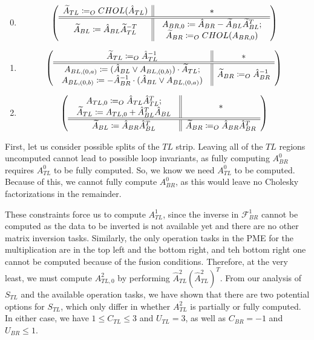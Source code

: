 \documentclass[12pt,letterpaper]{article}
\newcommand*{\opF}{\mathcal{F}}
\begin{document}
\begin{enumerate}
\setcounter{enumi}{-1} %
\item
  \begin{equation*}
  \left( \begin{array}{c || c} \widetilde{A}_{TL} \coloneqq_O CHOL(\hat{A}_{TL}) & * \\ \hline \hline \widetilde{A}_{BL} \coloneqq \hat{A}_{BL}\widetilde{A}_{TL}^{-T} & \begin{array}{c}
     A_{BR, 0} \coloneqq \hat{A}_{BR} - \widetilde{A}_{BL}\widetilde{A}_{BL}^T;\\
     \widetilde{A}_{BR} \coloneqq_O CHOL(A_{BR, 0})
   \end{array} \end{array} \right)
  \end{equation*}
\item
  \begin{equation*}
    \left( \begin{array}{c || c} \widetilde{A}_{TL} \coloneqq_O \hat{A}_{TL}^{-1} & * \\ \hline \hline \begin{array}{c}
       A_{BL, (0, a)} \coloneqq (\hat{A}_{BL} \vee A_{BL, (0, b)}) \cdot \widetilde{A}_{TL};\\
       A_{BL, (0, b)} \coloneqq -\hat{A}_{BR}^{-1} \cdot (\hat{A}_{BL} \vee A_{BL, (0, a)})
     \end{array} & \widetilde{A}_{BR} \coloneqq_O \hat{A}_{BR}^{-1} \end{array} \right)
  \end{equation*}
\item
  \begin{equation*}
    \left( \begin{array}{c || c} \begin{array}{c}
                   A_{TL, 0} \coloneqq_O \hat{A}_{TL}\hat{A}_{TL}^T;\\
                   \widetilde{A}_{TL} \coloneqq A_{TL, 0} + \hat{A}_{BL}^T\hat{A}_{BL}
                 \end{array} & * \\ \hline \hline \widetilde{A}_{BL} \coloneqq \hat{A}_{BR}\hat{A}_{BL}^T & \widetilde{A}_{BR} \coloneqq_O \hat{A}_{BR}\hat{A}_{BR}^T \end{array} \right)
  \end{equation*}
\end{enumerate}

First, let us consider possible splits of the $TL$ strip.
Leaving all of the $TL$ regions uncomputed cannot lead to possible loop invariants, as fully computing $A_{BR}^0$ requires $A_{TL}^0$ to be fully computed.
So, we know we need $A_{TL}^0$ to be computed.
Because of this, we cannot fully compute $A_{BR}^0$, as this would leave no Cholesky factorizations in the remainder.

These constraints force us to compute $A_{TL}^1$, since the inverse in $\opF_{BR}^1$ cannot be computed as the data to be inverted is not available yet and there are no other matrix inversion tasks.
Similarly, the only operation tasks in the PME for the multiplication are in the top left and the bottom right, and teh bottom right one cannot be computed because of the fusion conditions.
Therefore, at the very least, we must compute $A_{TL, 0}^2$ by performing $\hat{A}^2_{TL}(\hat{A}^2_{TL})^T$.
From our analysis of $S_{TL}$ and the available operation tasks, we have shown that there are two potential options for $S_{TL}$, which only differ in whether $A_{TL}^2$ is partially or fully computed.
In either case, we have $1 \leq C_{TL} \leq 3$ and $U_{TL} = 3$, as well as $C_{BR} = -1$ and $U_{BR} \leq 1$.
\end{document}
